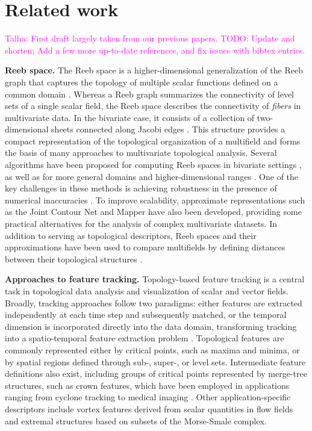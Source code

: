 \documentclass{vgtc}                          %
\newcommand{\myparagraph}[1]{\vspace{1mm} \noindent \textbf{#1}}
\newcommand{\Talha}[1]{\textcolor{magenta}{Talha: #1}\xspace}
\begin{document}
\section{Related work}
\Talha{First draft largely taken from our previous papers. TODO: Update and shorten; Add a few more up-to-date references, and fix issues with bibtex entries.}

\myparagraph{Reeb space.} The Reeb space is a higher-dimensional generalization of the Reeb graph that captures the topology of multiple scalar functions defined on a common domain \cite{Edelsbrunner2008}. Whereas a Reeb graph summarizes the connectivity of level sets of a single scalar field, the Reeb space describes the connectivity of \emph{fibers} in multivariate data. In the bivariate case, it consists of a collection of two-dimensional sheets connected along Jacobi edges \cite{Edelsbrunner2004b}. This structure provides a compact representation of the topological organization of a multifield and forms the basis of many approaches to multivariate topological analysis. Several algorithms have been proposed for computing Reeb spaces in bivariate settings \cite{Tierny2017,chattopadhyayAlgorithmFastCorrect2024,Hristov2026SingularAA}, as well as for more general domains and higher-dimensional ranges \cite{Edelsbrunner2008,hristov2025}. One of the key challenges in these methods is achieving robustness in the presence of numerical inaccuracies \cite{Hristov2025b}. To improve scalability, approximate representations such as the Joint Contour Net \cite{Carr2014} and Mapper \cite{Dey2016,Brown2021} have also been developed, providing some practical alternatives for the analysis of complex multivariate datasets. In addition to serving as topological descriptors, Reeb spaces and their approximations have been used to compare multifields by defining distances between their topological structures \cite{Ramamurthi2022a,Agarwal2021,Ramamurthi2024}.

\myparagraph{Approaches to feature tracking.} Topology-based feature tracking is a central task in topological data analysis and visualization of scalar and vector fields. Broadly, tracking approaches follow two paradigms: either features are extracted independently at each time step and subsequently matched, or the temporal dimension is incorporated directly into the data domain, transforming tracking into a spatio-temporal feature extraction problem \cite{Post2003,Weber2011}. Topological features are commonly represented either by critical points, such as maxima and minima, or by spatial regions defined through sub-, super-, or level sets. Intermediate feature definitions also exist, including groups of critical points represented by merge-tree structures, such as crown features, which have been employed in applications ranging from cyclone tracking to medical imaging \cite{Engelke2020,Nilsson2022Cyclone,Rasheed2022}. Other application-specific descriptors include vortex features derived from scalar quantities in flow fields and extremal structures based on subsets of the Morse-Smale complex.
\end{document}
